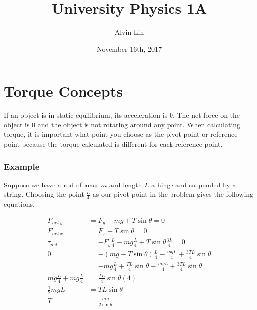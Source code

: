 \documentclass{math}
\title{University Physics 1A}
\author{Alvin Lin}
\date{November 16th, 2017}
\begin{document}
\maketitle

\section*{Torque Concepts}
If an object is in static equilibrium, its acceleration is 0. The net force on
the object is 0 and the object is not rotating around any point. When
calculating torque, it is important what point you choose as the pivot point
or reference point because the torque calculated is different for each reference
point.

\subsubsection*{Example}
Suppose we have a rod of mass \( m \) and length \(L \) a hinge and suspended
by a string. Choosing the point \( \frac{L}{4} \) as our pivot point in the
problem gives the following equations.
\begin{center}
\end{center}
\begin{align*}
  F_{net~y} &= F_y-mg+T\sin\theta = 0 \\
  F_{net~x} &= F_x-T\sin\theta = 0 \\
  \tau_{net} &= -F_y\frac{L}{4}-mg\frac{L}{4}+T\sin\theta\frac{3L}{4} = 0 \\
  0 &= -(mg-T\sin\theta)\frac{L}{4}-\frac{mgL}{4}+\frac{3TL}{4}\sin\theta \\
  &= -mg\frac{L}{4}+\frac{TL}{4}\sin\theta-\frac{mgL}{4}+
    \frac{3TL}{4}\sin\theta \\
  mg\frac{L}{4}+mg\frac{L}{4} &= \frac{TL}{4}\sin\theta(4) \\
  \frac{1}{2}mgL &= TL\sin\theta \\
  T &= \frac{mg}{2\sin\theta}
\end{align*}
\end{document}
